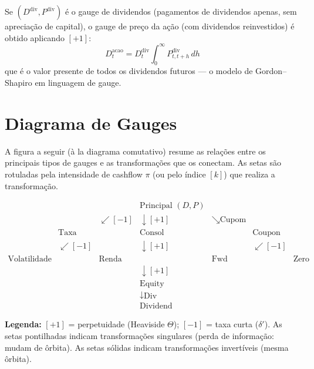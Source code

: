 \begin{ex}
Se $(D^{\text{div}}, P^{\text{div}})$ \'e o gauge de dividendos
(pagamentos de dividendos apenas, sem aprecia\c{c}\~ao de capital), o
gauge de pre\c{c}o da a\c{c}\~ao (com dividendos reinvestidos) \'e
obtido aplicando $[+1]$:
\[
D_t^{\text{acao}} = D_t^{\text{div}} \int_0^\infty P_{t,t+h}^{\text{div}}\,dh
\]
que \'e o valor presente de todos os dividendos futuros --- o modelo
de Gordon--Shapiro em linguagem de gauge.
\end{ex}

\section{Diagrama de Gauges}

A figura a seguir (\`a la diagrama comutativo) resume as
rela\c{c}\~oes entre os principais tipos de gauges e as
transforma\c{c}\~oes que os conectam. As setas s\~ao rotuladas pela
intensidade de cashflow $\pi$ (ou pelo \'indice $[k]$) que realiza a
transforma\c{c}\~ao.

\[
\begin{array}{ccccccc}
& & & \boxed{\text{Principal } (D,P)} & & & \\[4pt]
& & \swarrow[-1] & \downarrow[+1] & \searrow\text{Cupom} & & \\[4pt]
& \boxed{\text{Taxa Curta}} & & \boxed{\text{Consol}} & & \boxed{\text{Coupon Bond}} & \\[4pt]
& \swarrow[-1] & & \downarrow[+1] & & \swarrow[-1] & \\[4pt]
\boxed{\text{Volatilidade}} & & \boxed{\text{Renda Fixa}} & & \boxed{\text{Fwd Rate}} & & \boxed{\text{Zero Bond}} \\[4pt]
& & & \downarrow[+1] & & & \\[4pt]
& & & \boxed{\text{Equity}} & & & \\[4pt]
& & & \downarrow\text{Div} & & & \\[4pt]
& & & \boxed{\text{Dividend}} & & &
\end{array}
\]

\begin{center}
\small
\textbf{Legenda:} $[+1]$ = perpetuidade (Heaviside $\Theta$);
$[-1]$ = taxa curta ($\delta'$). As setas pontilhadas indicam
transforma\c{c}\~oes singulares (perda de informa\c{c}\~ao: mudam de
\^orbita). As setas s\'olidas indicam transforma\c{c}\~oes invert\'iveis
(mesma \^orbita).
\end{center}

